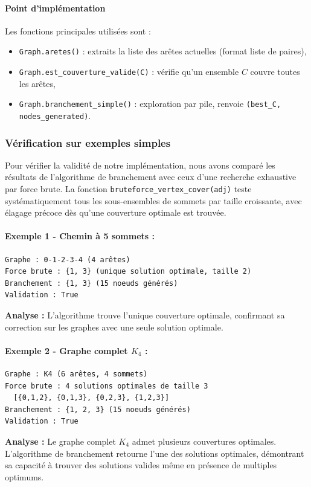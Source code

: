 \documentclass[11pt,a4paper]{article}
\begin{document}
\paragraph{Point d’impl\'ementation}
Les fonctions principales utilis\'ees sont :
\begin{itemize}
  \item \texttt{Graph.aretes()} : extraits la liste des ar\^etes actuelles (format liste de paires),
  \item \texttt{Graph.est\_couverture\_valide(C)} : v\'erifie qu’un ensemble $C$ couvre toutes les ar\^etes,
  \item \texttt{Graph.branchement\_simple()} : exploration par pile, renvoie \texttt{(best\_C, nodes\_generated)}.
\end{itemize}

\subsubsection{Vérification sur exemples simples}

Pour vérifier la validité de notre implémentation, nous avons comparé les résultats de l'algorithme de branchement avec ceux d'une recherche exhaustive par force brute. La fonction \texttt{bruteforce\_vertex\_cover(adj)} teste systématiquement tous les sous-ensembles de sommets par taille croissante, avec élagage précoce dès qu'une couverture optimale est trouvée.

\paragraph{Exemple 1 - Chemin à 5 sommets :}
\begin{verbatim}
Graphe : 0-1-2-3-4 (4 arêtes)
Force brute : {1, 3} (unique solution optimale, taille 2)
Branchement : {1, 3} (15 noeuds générés)
Validation : True
\end{verbatim}
\textbf{Analyse :} L'algorithme trouve l'unique couverture optimale, confirmant sa correction sur les graphes avec une seule solution optimale.

\paragraph{Exemple 2 - Graphe complet $K_4$ :}
\begin{verbatim}
Graphe : K4 (6 arêtes, 4 sommets)
Force brute : 4 solutions optimales de taille 3
  [{0,1,2}, {0,1,3}, {0,2,3}, {1,2,3}]
Branchement : {1, 2, 3} (15 noeuds générés)  
Validation : True
\end{verbatim}
\textbf{Analyse :} Le graphe complet $K_4$ admet plusieurs couvertures optimales. L'algorithme de branchement retourne l'une des solutions optimales, démontrant sa capacité à trouver des solutions valides même en présence de multiples optimums.
\end{document}
